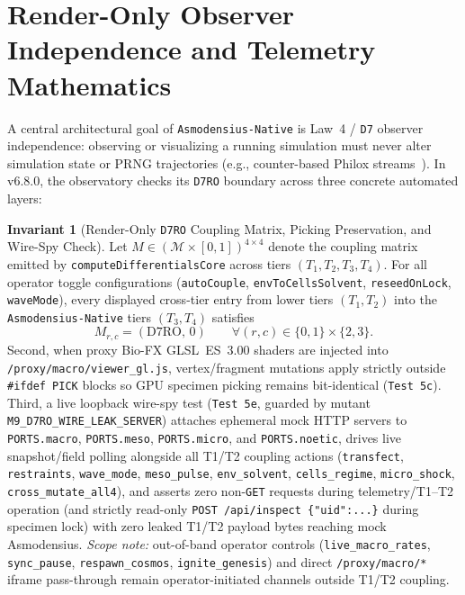\documentclass[11pt,reqno]{amsart}
\theoremstyle{definition}
\newtheorem{invariant}{Invariant}[section]
\newcommand{\code}[1]{{\footnotesize\nolinkurl{#1}}}
\begin{document}
\section{Render-Only Observer Independence and Telemetry Mathematics}
\label{sec:math}

A central architectural goal of \code{Asmodensius-Native} is Law~4 / \code{D7} observer independence: observing or visualizing a running simulation must never alter simulation state or PRNG trajectories (e.g., counter-based Philox streams~\cite{salmon2011}). In v6.8.0, the observatory checks its \code{D7RO} boundary across three concrete automated layers:

\begin{invariant}[Render-Only \code{D7RO} Coupling Matrix, Picking Preservation, and Wire-Spy Check]
\label{inv:d7ro}
Let $M \in (\mathcal{M} \times [0,1])^{4 \times 4}$ denote the coupling matrix emitted by \code{computeDifferentialsCore} across tiers $(T_1, T_2, T_3, T_4)$. For all operator toggle configurations (\code{autoCouple}, \code{envToCellsSolvent}, \code{reseedOnLock}, \code{waveMode}), every displayed cross-tier entry from lower tiers $(T_1, T_2)$ into the \code{Asmodensius-Native} tiers $(T_3, T_4)$ satisfies
\begin{equation}
  M_{r,c} = (\mathrm{D7RO},\, 0) \qquad \forall (r, c) \in \{0, 1\} \times \{2, 3\}.
  \label{eq:d7ro}
\end{equation}
Second, when proxy Bio-FX GLSL~ES~3.00 shaders are injected into \code{/proxy/macro/viewer\_gl.js}, vertex/fragment mutations apply strictly outside \code{\#ifdef PICK} blocks so GPU specimen picking remains bit-identical (\code{Test 5c}). Third, a live loopback wire-spy test (\code{Test 5e}, guarded by mutant \code{M9\_D7RO\_WIRE\_LEAK\_SERVER}) attaches ephemeral mock HTTP servers to \code{PORTS.macro}, \code{PORTS.meso}, \code{PORTS.micro}, and \code{PORTS.noetic}, drives live snapshot/field polling alongside all T1/T2 coupling actions (\code{transfect}, \code{restraints}, \code{wave\_mode}, \code{meso\_pulse}, \code{env\_solvent}, \code{cells\_regime}, \code{micro\_shock}, \code{cross\_mutate\_all4}), and asserts zero non-\code{GET} requests during telemetry/T1--T2 operation (and strictly read-only \code{POST /api/inspect \{"uid":...\}} during specimen lock) with zero leaked T1/T2 payload bytes reaching mock Asmodensius. \emph{Scope note:} out-of-band operator controls (\code{live\_macro\_rates}, \code{sync\_pause}, \code{respawn\_cosmos}, \code{ignite\_genesis}) and direct \code{/proxy/macro/*} iframe pass-through remain operator-initiated channels outside T1/T2 coupling.
\end{invariant}
\end{document}
